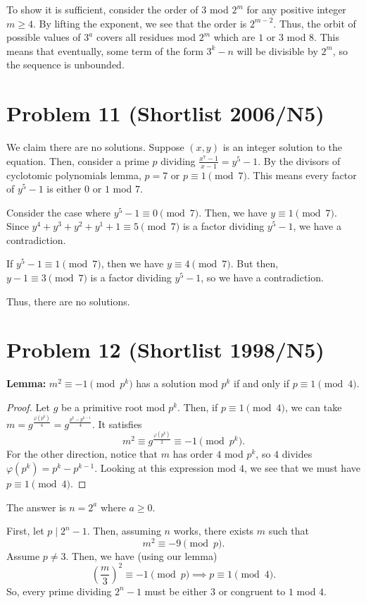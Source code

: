 \documentclass{scrartcl}
\begin{document}
To show it is sufficient, consider the order of $3$ mod $2^m$ for any positive integer $m \geq 4$.
By lifting the exponent, we see that the order is $2^{m-2}$.
Thus, the orbit of possible values of $3^a$ covers all residues mod $2^m$ which are $1$ or $3$ mod $8$.
This means that eventually, some term of the form $3^k - n$ will be divisible by $2^m$, so the sequence is unbounded.

\section*{Problem 11 (Shortlist 2006/N5)}
We claim there are no solutions.
Suppose $(x,y)$ is an integer solution to the equation.
Then, consider a prime $p$ dividing $\frac{x^7 - 1}{x-1} = y^5 - 1$.
By the divisors of cyclotomic polynomials lemma, $p = 7$ or $p \equiv 1 \pmod{7}$.
This means every factor of $y^5 - 1$ is either $0$ or $1$ mod $7$.

Consider the case where $y^5 - 1 \equiv 0 \pmod{7}$.
Then, we have $y \equiv 1 \pmod{7}$. 
Since $y^4 + y^3 + y^2 + y^1 + 1 \equiv 5 \pmod{7}$ is a factor dividing $y^5 - 1$, we have a contradiction.

If $y^5 - 1 \equiv 1 \pmod{7}$, then we have $y \equiv 4 \pmod{7}$.
But then, $y-1 \equiv 3 \pmod{7}$ is a factor dividing $y^5 - 1$, so we have a contradiction.

Thus, there are no solutions.

\section*{Problem 12 (Shortlist 1998/N5)}

\textbf{Lemma:} $m^2 \equiv -1 \pmod{p^k}$ has a solution mod $p^k$ if and only if $p \equiv 1 \pmod{4}$.
\begin{proof}
    Let $g$ be a primitive root mod $p^k$.
    Then, if $p \equiv 1 \pmod{4}$, we can take $m = g^{\frac{\varphi(p^k)}{4}} = g^{\frac{p^k - p^{k-1}}{4}}$.
    It satisfies
    \[ m^2 \equiv g^{\frac{\varphi(p^k)}{2}} \equiv -1 \pmod{p^k}. \]
    For the other direction, notice that $m$ has order $4$ mod $p^k$, so $4$ divides $\varphi(p^k) = p^k - p^{k-1}$.
    Looking at this expression mod $4$, we see that we must have $p \equiv 1 \pmod{4}$.
\end{proof}

The answer is $n = 2^a$ where $a \geq 0$.

First, let $p \mid 2^n - 1$.
Then, assuming $n$ works, there exists $m$ such that
\[ m^2 \equiv -9 \pmod{p}. \]
Assume $p \neq 3$.
Then, we have (using our lemma)
\[ \left( \frac{m}{3} \right)^2 \equiv -1 \pmod{p} \implies p \equiv 1 \pmod{4}. \]
So, every prime dividing $2^n - 1$ must be either $3$ or congruent to $1$ mod $4$.
\end{document}
